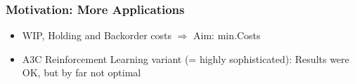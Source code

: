 \documentclass[xcolor=table%
,t]{beamer}
\begin{document}
\begin{frame}[t]
  \frametitle{Motivation: More Applications}


  \vspace{-1.5ex}
  \begin{block}{}

    \hspace*{-1.4ex}

    \begin{itemize}
    \item WIP, Holding and Backorder costs \(\Rightarrow\) Aim: min.\@ Costs
    \item A3C Reinforcement Learning variant (= highly sophisticated): Results were OK, but
      by far not optimal
    \end{itemize}

  \end{block}
  \begin{centering}
    \footnotesize
    \cite{SchneckenreitherHaeussler2019}

  \end{centering}
\end{frame}
\end{document}
